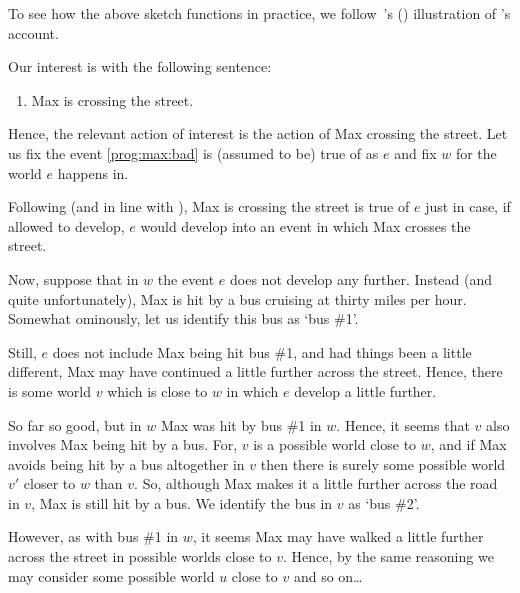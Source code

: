 \begin{note}
  To see how the above sketch functions in practice, we follow~\citeauthor{Portner:1998um}'s (\citeyear[764--766]{Portner:1998um}) illustration of \citeauthor{Landman:1992wh}'s account.
\end{note}

\begin{note}
  Our interest is with the following sentence:
  \begin{enumerate}
  \item
    \label{prog:max:bad}
    Max is crossing the street.
  \end{enumerate}

  Hence, the relevant action of interest is the action of Max crossing the street.
  Let us fix the event \ref{prog:max:bad} is (assumed to be) true of as \(e\) and fix \(w\) for the world \(e\) happens in.

  Following \citeauthor{Landman:1992wh} (and in line with \assuPP{}), Max is crossing the street is true of \(e\) just in case, if allowed to develop, \(e\) would develop into an event in which Max crosses the street.

  Now, suppose that in \(w\) the event \(e\) does not develop any further.
  Instead (and quite unfortunately), Max is hit by a bus cruising at thirty miles per hour.
  Somewhat ominously, let us identify this bus as `bus \#1'.

  Still, \(e\) does not include Max being hit bus \#1, and had things been a little different, Max may have continued a little further across the street.
  Hence, there is some world \(v\) which is close to \(w\) in which \(e\) develop a little further.

  So far so good, but in \(w\) Max was hit by bus \#1 in \(w\).
  Hence, it seems that \(v\) also involves Max being hit by a bus.
  For, \(v\) is a possible world close to \(w\), and if Max avoids being hit by a bus altogether in \(v\) then there is surely some possible world \(v'\) closer to \(w\) than \(v\).
  So, although Max makes it a little further across the road in \(v\), Max is still hit by a bus.
  We identify the bus in \(v\) as `bus \#2'.

  However, as with bus \#1 in \(w\), it seems Max may have walked a little further across the street in possible worlds close to \(v\).
  Hence, by the same reasoning we may consider some possible world \(u\) close to \(v\) and so on\dots


\end{note}

